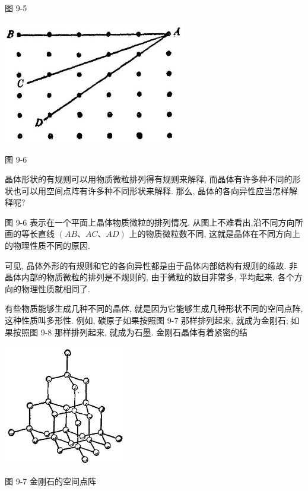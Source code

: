 \documentclass[10pt]{article}
\begin{document}
图 9-5

\begin{center}
\includegraphics[max width=0.6\textwidth]{images/01912d55-147c-70aa-b0e0-1782a122f948_263_904872.jpg}
\end{center}

图 9-6

晶体形状的有规则可以用物质微粒排列得有规则来解释, 而晶体有许多种不同的形状也可以用空间点阵有许多种不同形状来解释. 那么, 晶体的各向异性应当怎样解释呢?

图 9-6 表示在一个平面上晶体物质微粒的排列情况. 从图上不难看出,沿不同方向所画的等长直线 \(\left( {{AB}\text{、}{AC}\text{、}{AD}}\right)\) 上的物质微粒数不同, 这就是晶体在不同方向上的物理性质不同的原因.

可见, 晶体外形的有规则和它的各向异性都是由于晶体内部结构有规则的缘故. 非晶体内部的物质微粒的排列是不规则的, 由于微粒的数目非常多, 平均起来, 各个方向的物理性质就相同了.

有些物质能够生成几种不同的晶体, 就是因为它能够生成几种形状不同的空间点阵, 这种性质叫多形性. 例如, 碳原子如果按照图 9-7 那样排列起来, 就成为金刚石; 如果按照图 9-8 那样排列起来, 就成为石墨. 金刚石晶体有着紧密的结

\begin{center}
\includegraphics[max width=0.4\textwidth]{images/01912d55-147c-70aa-b0e0-1782a122f948_264_865953.jpg}
\end{center}

图 9-7 金刚石的空间点阵
\end{document}
